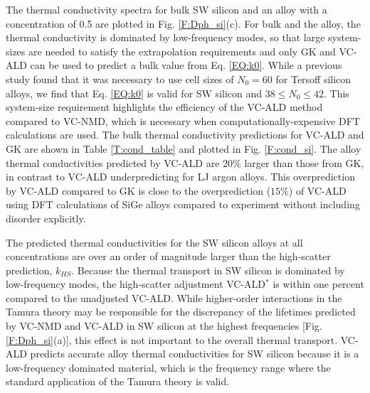 The thermal conductivity spectra for bulk SW silicon and an alloy 
with a concentration of 0.5 are plotted in Fig. \ref{F:Dph_si}(c). 
For bulk and the alloy, the thermal conductivity is dominated by 
low-frequency modes, so that large system-sizes are needed to satisfy 
the extrapolation requirements and only GK and VC-ALD can be used to 
predict a bulk value from Eq. \eqref{EQ:k0}. While a previous 
study found that it was necessary to use cell sizes of $N_0 = 60$ for Tersoff silicon 
alloys,\cite{he_morphology_2011} we find that  
Eq. \eqref{EQ:k0} is valid for SW silicon and $38 \le N_0 \le 42$. 
This system-size requirement highlights the efficiency of the 
VC-ALD method compared to VC-NMD, which is necessary when 
computationally-expensive DFT calculations are used.
\cite{esfarjani_method_2008,garg_role_2011,tian_phonon_2012,lindsay_thermal_2012,
esfarjani_heat_2011,chaput_phonon-phonon_2011}
The bulk thermal conductivity 
predictions for VC-ALD and GK are shown in Table \ref{T:cond_table} and 
plotted in Fig. \ref{F:cond_si}. The alloy thermal conductivities predicted 
by VC-ALD are $20\%$ larger than those from GK, in contrast to VC-ALD 
underpredicting for LJ argon alloys. This overprediction 
by VC-ALD compared to GK is close to the overprediction ($15\%$) of VC-ALD 
using DFT calculations of SiGe alloys compared to experiment 
without including disorder explicitly.\cite{garg_role_2011} 

The predicted thermal conductivities for the SW silicon alloys at 
all concentrations are over an order of magnitude larger than
the high-scatter prediction, $k_{HS}$. 
Because the thermal transport in SW silicon 
is dominated by low-frequency modes, the high-scatter adjustment  
VC-ALD$^*$ is within one percent compared 
to the unadjusted VC-ALD. 
While higher-order interactions in the Tamura theory 
may be responsible for the 
discrepancy of the lifetimes predicted by VC-NMD and VC-ALD in SW silicon 
at the highest frequencies [Fig. \ref{F:Dph_si}(a)],  
this effect is not important to the overall
thermal transport. VC-ALD predicts accurate alloy thermal 
conductivities for SW silicon because it is a low-frequency 
dominated material, which is the frequency range where the standard 
application of the Tamura theory is valid.\cite{tamura_isotope_1983} 

